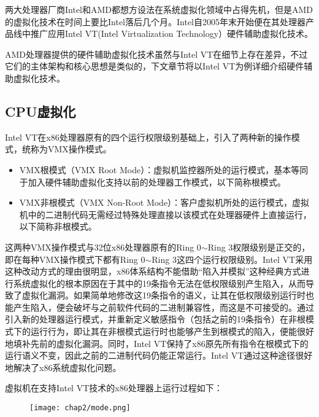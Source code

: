 两大处理器厂商Intel和AMD都想方设法在系统虚拟化领域中占得先机，但是AMD的虚拟化技术在时间上要比Intel落后几个月。Intel自2005年末开始便在其处理器产品线中推广应用Intel VT(Intel Virtualization Technology）硬件辅助虚拟化技术。

AMD处理器提供的硬件辅助虚拟化技术虽然与Intel VT在细节上存在差异，不过它们的主体架构和核心思想是类似的，下文章节将以Intel VT为例详细介绍硬件辅助虚拟化技术。

\subsection{CPU虚拟化}

Intel VT在x86处理器原有的四个运行权限级别基础上，引入了两种新的操作模式，统称为VMX操作模式。

\begin{itemize}
\item VMX根模式（VMX Root Mode）：虚拟机监控器所处的运行模式，基本等同于加入硬件辅助虚拟化支持以前的处理器工作模式，以下简称根模式。
\item VMX非根模式（VMX Non-Root Mode）：客户虚拟机所处的运行模式，虚拟机中的二进制代码无需经过特殊处理直接以该模式在处理器硬件上直接运行，以下简称非根模式。
\end{itemize}

这两种VMX操作模式与32位x86处理器原有的Ring 0$\sim$Ring 3权限级别是正交的，即在每种VMX操作模式下都有Ring 0$\sim$Ring 3这四个运行权限级别。Intel VT采用这种改动方式的理由很明显，x86体系结构不能借助``陷入并模拟''这种经典方式进行系统虚拟化的根本原因在于其中的19条指令无法在低权限级别产生陷入，从而导致了虚拟化漏洞。如果简单地修改这19条指令的语义，让其在低权限级别运行时也能产生陷入，便会破坏与之前软件代码的二进制兼容性，而这是不可接受的。通过引入新的处理器运行模式，并重新定义敏感指令（包括之前的19条指令）在非根模式下的运行行为，即让其在非根模式运行时也能够产生到根模式的陷入，便能很好地填补先前的虚拟化漏洞。同时，Intel VT保持了x86原先所有指令在根模式下的运行语义不变，因此之前的二进制代码仍能正常运行。Intel VT通过这种途径很好地解决了x86系统虚拟化问题。

虚拟机在支持Intel VT技术的x86处理器上运行过程如下：

\begin{figure}[!htp]
  \centering
  \texttt{[image: chap2/mode.png]}
\end{figure}

